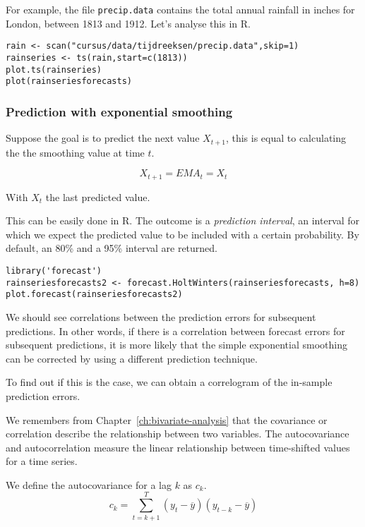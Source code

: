   For example, the file \texttt{precip.data} contains the total annual rainfall in inches for London, between 1813 and 1912. Let's analyse this in R.
  
\begin{lstlisting}
rain <- scan("cursus/data/tijdreeksen/precip.data",skip=1)
rainseries <- ts(rain,start=c(1813))
plot.ts(rainseries)
plot(rainseriesforecasts)
\end{lstlisting} 


\subsubsection{Prediction with exponential smoothing}

Suppose the goal is to predict the next value $X_{t+1}$, this is equal to calculating the the smoothing value at time $t$.

\begin{equation}
	X_{t+1} = EMA_t = X_t
	\label{eq:EMA}
\end{equation}

With $X_t$ the last predicted value.

This can be easily done in R. The outcome is a \emph{prediction interval}, an interval for which we expect the predicted value to be included with a certain probability. By default, an 80\% and a 95\% interval are returned.

\begin{lstlisting} 
library('forecast')
rainseriesforecasts2 <- forecast.HoltWinters(rainseriesforecasts, h=8)
plot.forecast(rainseriesforecasts2)
\end{lstlisting} 

We should see correlations between the prediction errors for subsequent predictions. In other words, if there is a correlation between forecast errors for subsequent predictions, it is more likely that the simple exponential smoothing can be corrected by using a different prediction technique.

To find out if this is the case, we can obtain a correlogram of the in-sample prediction errors.

We remembers from Chapter~\ref{ch:bivariate-analysis} that the covariance or correlation describe the relationship between two variables. The autocovariance and autocorrelation measure the linear relationship between time-shifted values for a time series.

\begin{definition}[Autocovariance]
  We define the autocovariance for a lag $k$ as $c_k$.
	\[ c_k = \sum_{t=k+1}^{T} (y_t - \overline{y})(y_{t-k} - \overline{y}) \]
\end{definition}

